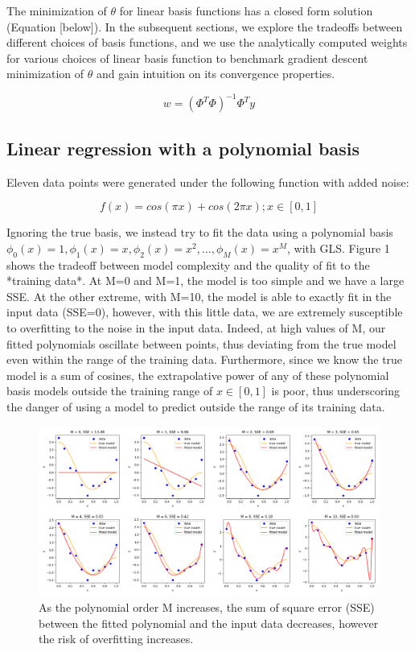 \documentclass[10pt]{article}
\begin{document}
The minimization of $\theta$ for linear basis functions has a closed form solution (Equation [below]). In the subsequent sections, we explore the tradeoffs between different choices of basis functions, and we use the analytically computed weights for various choices of linear basis function to benchmark gradient descent minimization of $\theta$ and gain intuition on its convergence properties. 

$$w = (\Phi^T\Phi)^{-1}\Phi^Ty$$

\subsection{Linear regression with a polynomial basis}

Eleven data points were generated under the following function with added noise:


$$f(x) = cos(\pi x) + cos(2\pi x); x \in [0,1]$$



Ignoring the true basis, we instead try to fit the data using a polynomial basis $\phi_0(x) = 1, \phi_1(x) = x, \phi_2(x) = x^2, ... , \phi_M(x) = x^M$, with GLS.  Figure 1 shows the tradeoff between model complexity and the quality of fit to the *training data*. At M=0 and M=1, the model is too simple and we have a large SSE. At the other extreme, with M=10, the model is able to exactly fit in the input data (SSE=0), however, with this little data, we are extremely susceptible to overfitting to the noise in the input data. Indeed, at high values of M, our fitted polynomials oscillate between points, thus deviating from the true model even within the range of the training data. Furthermore, since we know the true model is a sum of cosines, the extrapolative power of any of these polynomial basis models outside the training range of $x \in [0,1]$ is poor, thus underscoring the danger of using a model to predict outside the range of its training data.

\begin{figure}
\caption{As the polynomial order M increases, the sum of square error (SSE) between the fitted polynomial and the input data decreases, however the risk of overfitting increases.}
\begin{center}
\includegraphics[width=450px]{all_regress_m}
\end{center}
\end{figure}
\end{document}
